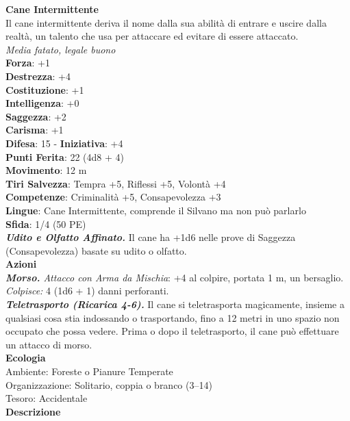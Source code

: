 \begin{multicols}{2}
\medskip\textbf{Cane Intermittente}\\
Il cane intermittente deriva il nome dalla sua abilità di entrare e uscire dalla realtà, un talento che usa per attaccare ed evitare di essere attaccato. \\
\emph{Media fatato, legale buono}\\
\textbf{Forza}: +1\\
\textbf{Destrezza}: +4\\
\textbf{Costituzione}: +1\\
\textbf{Intelligenza}: +0\\
\textbf{Saggezza}: +2\\
\textbf{Carisma}: +1\\
\textbf{Difesa}: 15 - \textbf{Iniziativa}: +4\\
\textbf{Punti Ferita}: 22 (4d8 + 4)\\
\textbf{Movimento}: 12 m\\
\textbf{Tiri Salvezza}:  Tempra +5, Riflessi +5, Volontà +4 \\
\textbf{Competenze}: Criminalità +5, Consapevolezza +3\\
\textbf{Lingue}: Cane Intermittente, comprende il Silvano ma non può parlarlo\\
\textbf{Sfida}: 1/4 (50 PE)\smallskip\\
\emph{\textbf{Udito e Olfatto Affinato.}} Il cane ha +1d6 nelle prove di Saggezza (Consapevolezza) basate su udito o olfatto.\\
\smallskip\textbf{Azioni}\\
\emph{\textbf{Morso.} Attacco con Arma da Mischia}: +4 al colpire, portata 1 m, un bersaglio.\\
\emph{Colpisce:} 4 (1d6 + 1) danni perforanti.\\
\emph{\textbf{Teletrasporto (Ricarica 4-6).}} Il cane si teletrasporta magicamente, insieme a qualsiasi cosa stia indossando o trasportando, fino a 12 metri in uno spazio non occupato che possa vedere. Prima o dopo il teletrasporto, il cane può effettuare un attacco di morso.\\
\textbf{Ecologia}\\
Ambiente: Foreste o Pianure Temperate\\
Organizzazione: Solitario, coppia o branco (3–14)\\
Tesoro: Accidentale\\
\textbf{Descrizione}\\


\end{multicols}
